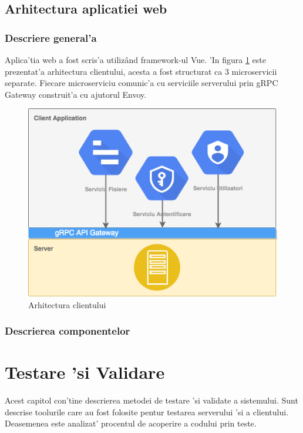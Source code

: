 \documentclass[12pt,a4paper,twoside]{report}
\begin{document}
\section{Arhitectura aplicatiei web}

\subsection{Descriere general'a}
Aplica'tia web a fost scris'a utilizând framework-ul Vue. 'In figura \ref{client_arch} este prezentat'a arhitectura clientului, acesta a fost structurat ca 3 microservicii separate. Fiecare microserviciu comunic'a cu serviciile serverului prin gRPC Gateway construit'a cu ajutorul Envoy.
 \begin{figure}[H]
\begin{center}
\advance\leftskip-3cm
\advance\rightskip-3cm
\includegraphics[keepaspectratio=true,scale=0.58]{img/client_arch.png}
\caption{Arhitectura clientului}
\label{client_arch}
\end{center}
\end{figure}
\subsection{Descrierea componentelor}


\chapter{Testare 'si Validare}
Acest capitol con'tine descrierea metodei de testare 'si validate a sistemului. Sunt descrise toolurile care au fost folosite pentur testarea serverului 'si a clientului. Deasemenea este analizat' procentul de acoperire a codului prin teste.
\end{document}
